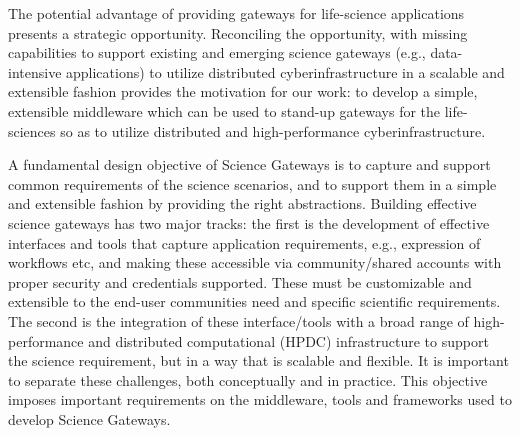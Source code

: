 \documentclass[]{svjour3}
\begin{document}
The potential advantage of providing gateways for life-science
applications presents a strategic opportunity.  Reconciling the
opportunity, with missing capabilities to support existing and
emerging science gateways (e.g., data-intensive applications) to
utilize distributed cyberinfrastructure in a scalable and extensible
fashion provides the motivation for our work: to develop a simple,
extensible middleware which can be used to stand-up gateways for the
life-sciences so as to utilize distributed and high-performance
cyberinfrastructure. 



A fundamental design
objective of Science Gateways is to capture and support common
requirements of the science scenarios, and to support them in a simple
and extensible fashion by providing the right abstractions.  Building
effective science gateways has two major tracks: the first is the
development of effective interfaces and tools that capture application
requirements, e.g., expression of workflows etc, and making these
accessible via community/shared accounts with proper security and
credentials supported. These must be customizable and extensible to
the end-user communities need and specific scientific
requirements. The second is the integration of these interface/tools
with a broad range of high-performance and distributed computational
(HPDC) infrastructure to support the science requirement, but in a way
that is scalable and flexible.  It is important to separate these
challenges, both conceptually and in practice.  This objective imposes
important requirements on the middleware, tools and frameworks used to
develop Science Gateways.
\end{document}
